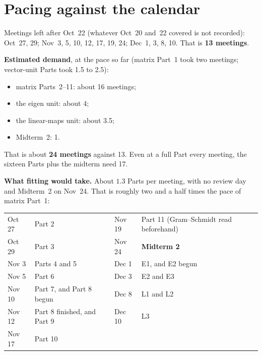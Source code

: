 \documentclass[11pt]{article}
\begin{document}
\section{Pacing against the calendar}\label{sec:pacing}
Meetings left after Oct~22 (whatever Oct~20 and~22 covered is not recorded):
Oct~27, 29; Nov~3, 5, 10, 12, 17, 19, 24; Dec~1, 3, 8, 10. That is
\textbf{13 meetings}.

\medskip
\noindent\textbf{Estimated demand}, at the pace so far (matrix Part~1 took two
meetings; vector-unit Parts took 1.5 to 2.5):
\begin{itemize}[leftmargin=1.4em]
  \item matrix Parts~2--11: about 16 meetings;
  \item the eigen unit: about 4;
  \item the linear-maps unit: about 3.5;
  \item Midterm~2: 1.
\end{itemize}
That is about \textbf{24 meetings} against 13. Even at a full Part every
meeting, the sixteen Parts plus the midterm need 17.

\medskip
\noindent\textbf{What fitting would take.} About $1.3$ Parts per meeting, with
no review day and Midterm~2 on Nov~24. That is roughly two and a half times
the pace of matrix Part~1:

{\renewcommand{\arraystretch}{1.25}
\begin{center}
\small
\begin{tabular}{@{}l l @{\qquad} l l@{}}
\toprule
Oct 27 & Part 2 & Nov 19 & Part 11 (Gram--Schmidt read beforehand) \\
Oct 29 & Part 3 & Nov 24 & \textbf{Midterm 2} \\
Nov 3  & Parts 4 and 5 & Dec 1  & E1, and E2 begun \\
Nov 5  & Part 6 & Dec 3  & E2 and E3 \\
Nov 10 & Part 7, and Part 8 begun & Dec 8  & L1 and L2 \\
Nov 12 & Part 8 finished, and Part 9 & Dec 10 & L3 \\
Nov 17 & Part 10 &        & \\
\bottomrule
\end{tabular}
\end{center}}
\end{document}
